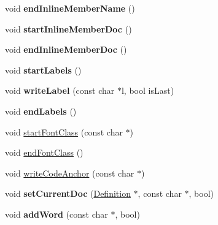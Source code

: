 \begin{DoxyCompactItemize}
\item 
\hypertarget{class_r_t_f_generator_a41cbfeb50f86a4c1531e2012dbcbb209}{void {\bfseries end\-Inline\-Member\-Name} ()}\label{class_r_t_f_generator_a41cbfeb50f86a4c1531e2012dbcbb209}

\item 
\hypertarget{class_r_t_f_generator_a2a23f25caeb56aba89bc2b2c4147a2d2}{void {\bfseries start\-Inline\-Member\-Doc} ()}\label{class_r_t_f_generator_a2a23f25caeb56aba89bc2b2c4147a2d2}

\item 
\hypertarget{class_r_t_f_generator_a7a50d2a68d8d8805c86482012f422cba}{void {\bfseries end\-Inline\-Member\-Doc} ()}\label{class_r_t_f_generator_a7a50d2a68d8d8805c86482012f422cba}

\item 
\hypertarget{class_r_t_f_generator_aa1c00a079e425e24bbbb9291a698cbf2}{void {\bfseries start\-Labels} ()}\label{class_r_t_f_generator_aa1c00a079e425e24bbbb9291a698cbf2}

\item 
\hypertarget{class_r_t_f_generator_a4877c6f161162a399bf051570dee0c4a}{void {\bfseries write\-Label} (const char $\ast$l, bool is\-Last)}\label{class_r_t_f_generator_a4877c6f161162a399bf051570dee0c4a}

\item 
\hypertarget{class_r_t_f_generator_a26e386d6fcaae518c16e018bee486a61}{void {\bfseries end\-Labels} ()}\label{class_r_t_f_generator_a26e386d6fcaae518c16e018bee486a61}

\item 
void \hyperlink{class_r_t_f_generator_ad907f4c47cf56f8aac603de5537963f0}{start\-Font\-Class} (const char $\ast$)
\item 
void \hyperlink{class_r_t_f_generator_ab7851025d80a6d1ed6dd8e25016136e1}{end\-Font\-Class} ()
\item 
void \hyperlink{class_r_t_f_generator_a688757a1dcb8c6bef1202433a36083a7}{write\-Code\-Anchor} (const char $\ast$)
\item 
\hypertarget{class_r_t_f_generator_a71a2ac1fad218c1ccb067138cdfaae22}{void {\bfseries set\-Current\-Doc} (\hyperlink{class_definition}{Definition} $\ast$, const char $\ast$, bool)}\label{class_r_t_f_generator_a71a2ac1fad218c1ccb067138cdfaae22}

\item 
\hypertarget{class_r_t_f_generator_a1243ea01d31796d179387017700b7d12}{void {\bfseries add\-Word} (const char $\ast$, bool)}\label{class_r_t_f_generator_a1243ea01d31796d179387017700b7d12}

\end{DoxyCompactItemize}
